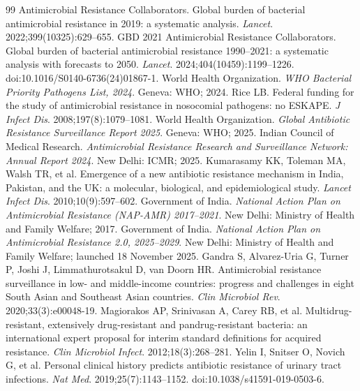 \documentclass[11pt,a4paper]{article}
\begin{document}
\begin{thebibliography}{99}\small
{} Antimicrobial Resistance Collaborators. Global burden of bacterial antimicrobial resistance in 2019: a systematic analysis. \textit{Lancet}. 2022;399(10325):629--655.
 GBD 2021 Antimicrobial Resistance Collaborators. Global burden of bacterial antimicrobial resistance 1990--2021: a systematic analysis with forecasts to 2050. \textit{Lancet}. 2024;404(10459):1199--1226. doi:10.1016/S0140-6736(24)01867-1.
 World Health Organization. \textit{WHO Bacterial Priority Pathogens List, 2024}. Geneva: WHO; 2024.
 Rice LB. Federal funding for the study of antimicrobial resistance in nosocomial pathogens: no ESKAPE. \textit{J Infect Dis}. 2008;197(8):1079--1081.
 World Health Organization. \textit{Global Antibiotic Resistance Surveillance Report 2025}. Geneva: WHO; 2025.
 Indian Council of Medical Research. \textit{Antimicrobial Resistance Research and Surveillance Network: Annual Report 2024}. New Delhi: ICMR; 2025.
 Kumarasamy KK, Toleman MA, Walsh TR, et al. Emergence of a new antibiotic resistance mechanism in India, Pakistan, and the UK: a molecular, biological, and epidemiological study. \textit{Lancet Infect Dis}. 2010;10(9):597--602.
 Government of India. \textit{National Action Plan on Antimicrobial Resistance (NAP-AMR) 2017--2021}. New Delhi: Ministry of Health and Family Welfare; 2017.
 Government of India. \textit{National Action Plan on Antimicrobial Resistance 2.0, 2025--2029}. New Delhi: Ministry of Health and Family Welfare; launched 18 November 2025.
 Gandra S, Alvarez-Uria G, Turner P, Joshi J, Limmathurotsakul D, van Doorn HR. Antimicrobial resistance surveillance in low- and middle-income countries: progress and challenges in eight South Asian and Southeast Asian countries. \textit{Clin Microbiol Rev}. 2020;33(3):e00048-19.
 Magiorakos AP, Srinivasan A, Carey RB, et al. Multidrug-resistant, extensively drug-resistant and pandrug-resistant bacteria: an international expert proposal for interim standard definitions for acquired resistance. \textit{Clin Microbiol Infect}. 2012;18(3):268--281.
 Yelin I, Snitser O, Novich G, et al. Personal clinical history predicts antibiotic resistance of urinary tract infections. \textit{Nat Med}. 2019;25(7):1143--1152. doi:10.1038/s41591-019-0503-6.

\end{thebibliography}
\end{document}
